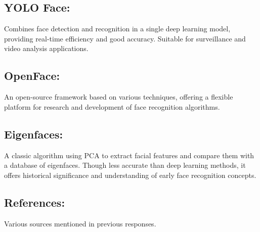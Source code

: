 \documentclass[11pt]{article}
\begin{document}
\subsection*{YOLO Face:}
Combines face detection and recognition in a single deep learning model, providing real-time efficiency and good accuracy. Suitable for surveillance and video analysis applications.

\subsection*{OpenFace:}
An open-source framework based on various techniques, offering a flexible platform for research and development of face recognition algorithms.

\subsection*{Eigenfaces:}
A classic algorithm using PCA to extract facial features and compare them with a database of eigenfaces. Though less accurate than deep learning methods, it offers historical significance and understanding of early face recognition concepts.

\subsection*{References:}
Various sources mentioned in previous responses.
\end{document}
